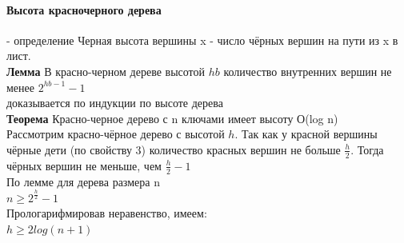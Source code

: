 \documentclass[a4paper,10pt]{article}
\begin{document}
\paragraph{Высота красночерного дерева} - определение
Черная высота вершины x - число чёрных вершин на пути из x в лист.\\
\textbf{Лемма} В красно-черном дереве высотой $hb$ количество внутренних вершин не менее $2^{hb-1}-1$\\
доказывается по индукции по высоте дерева\\
\textbf{Теорема} Красно-черное дерево с n ключами имеет высоту О(log n)\\
Рассмотрим красно-чёрное дерево с высотой $h$. Так как у красной вершины чёрные дети (по свойству 3) количество красных вершин не больше $\frac{h}{2}$. Тогда чёрных вершин не меньше, чем $\frac{h}{2} - 1$\\
По лемме для дерева размера n\\
$n \geq 2^{\frac{h}{2}}-1$\\
Прологарифмировав неравенство, имеем:\\
$h \geq 2log(n+1)$\\
\end{document}
